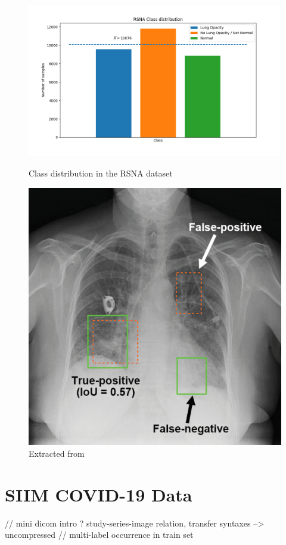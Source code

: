 \begin{figure}
	\begin{minipage}[b]{.65\linewidth} %
		\includegraphics[width=\linewidth]{img/rsna_class_distribution.png}
		\caption{Class distribution in the RSNA dataset}
		\label{fig:rsna_classes}
	\end{minipage}
	\begin{minipage}[b]{.35\linewidth} %
		\includegraphics[width=\linewidth]{img/rsna_sample.png}
		\caption{Extracted from \autocite{rsnaSurvey}}
		\label{fig:rsna_sample}
	\end{minipage}
\end{figure}

\section{SIIM COVID-19 Data}\label{data:siim}

// mini dicom intro ? study-series-image relation, transfer syntaxes --> uncompressed
// multi-label occurrence in train set

